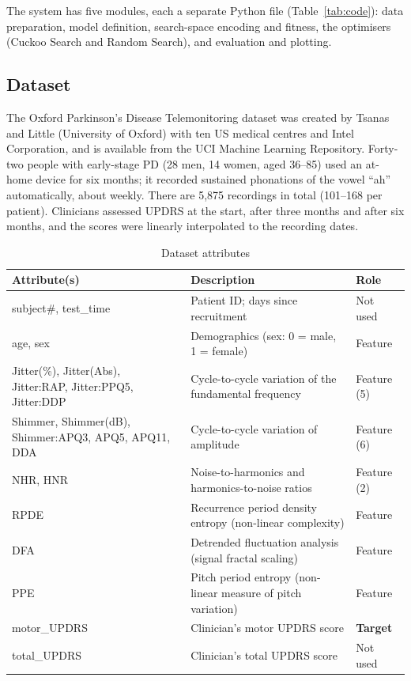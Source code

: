 \documentclass[12pt,a4paper]{article}
\numberwithin{equation}{section}
\numberwithin{table}{section}
\numberwithin{figure}{section}
\begin{document}
The system has five modules, each a separate Python file (Table~\ref{tab:code}): data preparation, model definition, search-space encoding and fitness, the optimisers (Cuckoo Search and Random Search), and evaluation and plotting.

\subsection{Dataset}
The Oxford Parkinson's Disease Telemonitoring dataset \cite{tsanas2010} was created by Tsanas and Little (University of Oxford) with ten US medical centres and Intel Corporation, and is available from the UCI Machine Learning Repository. Forty-two people with early-stage PD (28 men, 14 women, aged 36--85) used an at-home device for six months; it recorded sustained phonations of the vowel ``ah'' automatically, about weekly. There are 5,875 recordings in total (101--168 per patient). Clinicians assessed UPDRS at the start, after three months and after six months, and the scores were linearly interpolated to the recording dates.

\begin{table}[H]
\centering
\caption{Dataset attributes}
\label{tab:attrs}
\small
\renewcommand{\arraystretch}{1.15}
\begin{tabularx}{\textwidth}{@{}>{\raggedright}p{5.6cm}>{\raggedright\arraybackslash}Xl@{}}
\toprule
\textbf{Attribute(s)} & \textbf{Description} & \textbf{Role} \\ \midrule
subject\#, test\_time & Patient ID; days since recruitment & Not used \\
age, sex & Demographics (sex: 0 = male, 1 = female) & Feature \\
Jitter(\%), Jitter(Abs), Jitter:RAP, Jitter:PPQ5, Jitter:DDP & Cycle-to-cycle variation of the fundamental frequency & Feature (5) \\
Shimmer, Shimmer(dB), Shimmer:APQ3, APQ5, APQ11, DDA & Cycle-to-cycle variation of amplitude & Feature (6) \\
NHR, HNR & Noise-to-harmonics and harmonics-to-noise ratios & Feature (2) \\
RPDE & Recurrence period density entropy (non-linear complexity) & Feature \\
DFA & Detrended fluctuation analysis (signal fractal scaling) & Feature \\
PPE & Pitch period entropy (non-linear measure of pitch variation) & Feature \\
motor\_UPDRS & Clinician's motor UPDRS score & \textbf{Target} \\
total\_UPDRS & Clinician's total UPDRS score & Not used \\ \bottomrule
\end{tabularx}
\end{table}
\end{document}
